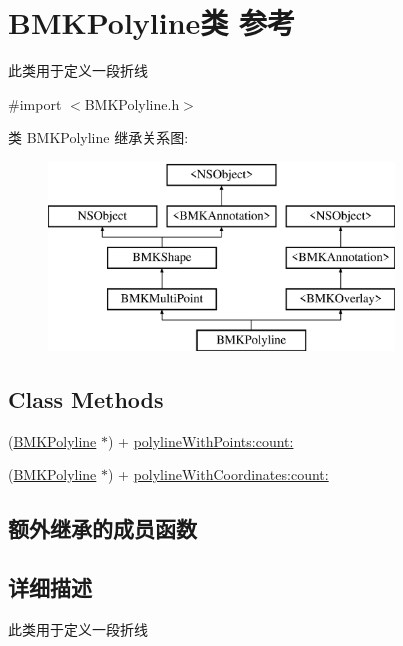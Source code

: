 \hypertarget{interface_b_m_k_polyline}{\section{B\+M\+K\+Polyline类 参考}
\label{interface_b_m_k_polyline}
}


此类用于定义一段折线  




{\ttfamily \#import $<$B\+M\+K\+Polyline.\+h$>$}

类 B\+M\+K\+Polyline 继承关系图\+:\begin{figure}[H]
\begin{center}
\leavevmode
\includegraphics[height=5.000000cm]{interface_b_m_k_polyline}
\end{center}
\end{figure}
\subsection*{Class Methods}
\begin{DoxyCompactItemize}
\item 
(\hyperlink{interface_b_m_k_polyline}{B\+M\+K\+Polyline} $\ast$) + \hyperlink{interface_b_m_k_polyline_aa4f399b9bcc1c33b871b3d8152842eac}{polyline\+With\+Points\+:count\+:}
\item 
(\hyperlink{interface_b_m_k_polyline}{B\+M\+K\+Polyline} $\ast$) + \hyperlink{interface_b_m_k_polyline_af43f8ff39d6a8c56f28f3294f9c41681}{polyline\+With\+Coordinates\+:count\+:}
\end{DoxyCompactItemize}
\subsection*{额外继承的成员函数}


\subsection{详细描述}
此类用于定义一段折线 

